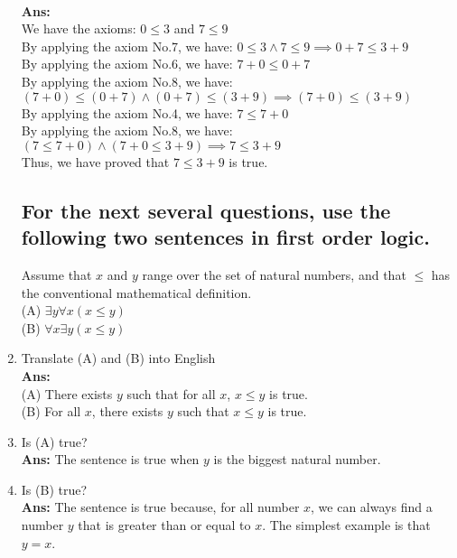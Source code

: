 \documentclass[12pt]{article}
\begin{document}
\begin{enumerate}
{%
}\\
\textbf{Ans:}\\
We have the axioms: \(0 \leq 3\) and \(7 \leq 9\)\\
By applying the axiom No.7, we have: \(0 \leq 3 \land 7 \leq 9 \implies 0 + 7 \leq 3 + 9\)\\
By applying the axiom No.6, we have: \(7 + 0 \leq 0 + 7\)\\
By applying the axiom No.8, we have: \((7 + 0) \leq (0 + 7) \land (0 + 7) \leq (3 + 9) \implies (7 + 0) \leq (3 + 9)\)\\
By applying the axiom No.4, we have: \(7 \leq 7 + 0\)\\
By applying the axiom No.8, we have: \((7 \leq 7 + 0) \land (7 + 0 \leq 3 + 9) \implies 7 \leq 3 + 9\)\\
Thus, we have proved that \(7 \leq 3 + 9\)  is true.

\subsection*{For the next several questions, use the following two sentences in first order logic.}
Assume that \(x\) and \(y\) range over the set of natural numbers, and that \(\leq\) has the conventional mathematical definition. \\
(A) \(\exists y \forall x (x \leq y)\) \\
(B) \(\forall x \exists y (x \leq y)\)

\item{Translate (A) and (B) into English}\\
\textbf{Ans:}\\
(A) There exists $y$ such that for all $x$, $x \leq y$ is true.\\
(B) For all $x$, there exists $y$ such that \(x \leq y\) is true.

\item{Is (A) true?}\\
\textbf{Ans:} The sentence is true when $y$ is the biggest natural number.

\item{Is (B) true?}\\ 
\textbf{Ans:} The sentence is true because, for all number $x$, we can always find a number $y$ that is greater than or equal to $x$. The simplest example is that $y = x$.


\end{enumerate}
\end{document}
